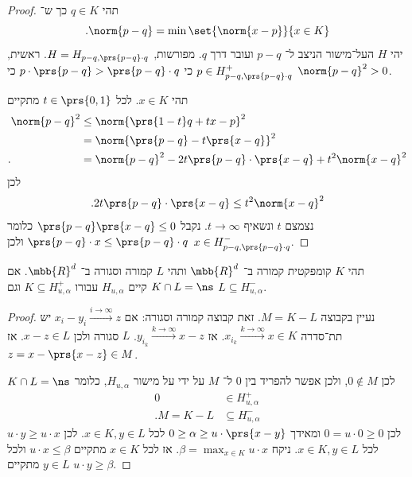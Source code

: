 \documentclass[a4paper,10pt,twoside,openany]{book}
\begin{document}
\begin{proof}
תהי
$q \in K$
כך ש־%
\[\text{.} \norm{p - q} = \min \set{\norm{x-p}}{x \in K}\]
יהי
$H$
העל־מישור הניצב ל־%
$p-q$
ועובר דרך
$q$.
מפורשות,
$H = H_{p-q, \prs{p-q}\cdot q}$.
ראשית,
$p \in H^+_{p-q, \prs{p-q}\cdot q}$
כי
$p \cdot \prs{p-q} > \prs{p-q} \cdot q$
כי
$\norm{p-q}^2 > 0$.

תהי
$x \in K$.
לכל
$t \in \prs{0,1}$
מתקיים
\begin{align*}
\norm{p-q}^2 &\leq \norm{\prs{1-t}q + tx - p}^2
\\&= \norm{\prs{p-q} - t\prs{x-q}}^2
\\ \text{.} \hphantom{\norm{p-q}^2} &= \norm{p-q}^2 - 2t\prs{p-q}\cdot\prs{x-q} + t^2 \norm{x-q}^2
\end{align*}
לכן
\begin{align*}
\text{.} 2t \prs{p-q} \cdot \prs{x-q} \leq t^2 \norm{x-q}^2
\end{align*}
נצמצם
$t$
ונשאיף
$t \to \infty$.
נקבל
$\prs{p-q}\prs{x-q} \leq 0$
כלומר
$\prs{p-q} \cdot x \leq \prs{p-q} \cdot q$
ולכן
$x \in H^-_{p-q,\prs{p-q} \cdot q}$.
\end{proof}

\begin{theorem}
תהי
$K$
קומפקטית קמורה ב־%
$\mbb{R}^d$
ותהי
$L$
קמורה וסגורה ב־%
$\mbb{R}^d$.
אם
$K \cap L = \ns$
קיים
$H_{u,\alpha}$
עבורו
$K \subseteq H_{u,\alpha}^+$
וגם
$L \subseteq H_{u,\alpha}^-$.
\end{theorem}

\begin{proof}
נעיין בקבוצה
$M = K - L$.
זאת קבוצה קמורה וסגורה:
אם
$x_i - y_i \xrightarrow{i\to\infty} z$
יש תת־סדרה
$x_{i_k} \xrightarrow{k\to\infty} x \in K$.
אז
$y_{i_k} \xrightarrow{k\to\infty} x-z$.
$L$
סגורה ולכן
$x-z \in L$.
אז
$z = x - \prs{x-z} \in M$.

$K \cap L = \ns$
לכן
$0 \notin M$,
ולכן אפשר להפריד בין
$0$
ל־%
$M$
על ידי על מישור
$H_{u,\alpha}$,
כלומר
\begin{align*}
0 &\in H_{u,\alpha}^+ \\
\text{.} M = K-L &\subseteq H_{u,\alpha}^-
\end{align*}
לכן
$0 = u \cdot 0 \geq 0$
ומאידך
$0 \geq \alpha \geq u \cdot \prs{x-y}$
לכל
$x \in K, y \in L$.
לכן
$u \cdot y \geq u \cdot x$
לכל
$x \in K, y \in L$.
ניקח
$\beta = \max_{x \in K} u \cdot x$.
אז לכל
$x \in K$
מתקיים
$u \cdot x \leq \beta$
ולכל
$y \in L$
מתקיים
$u \cdot y \geq \beta$.
\end{proof}
\end{document}
